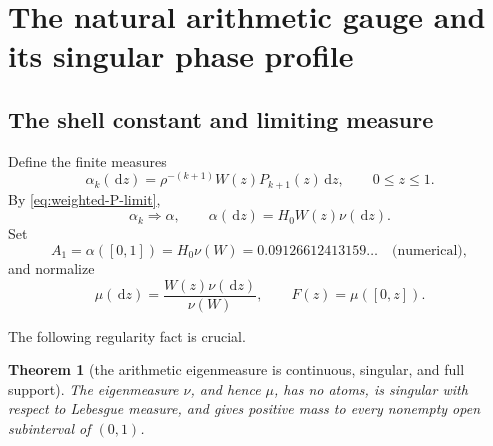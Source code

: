 \documentclass[11pt,oneside]{article}
\newtheorem{theorem}{Theorem}[section]
\theoremstyle{definition}
\theoremstyle{remark}
\newcommand{\dd}{\,\mathrm d}
\begin{document}
\section{The natural arithmetic gauge and its singular phase profile}
\label{sec:natural-gauge}

\subsection{The shell constant and limiting measure}

Define the finite measures
\begin{equation}
 \alpha_k(\dd z)
 =\rho^{-(k+1)}W(z)P_{k+1}(z)\dd z,
 \qquad 0\le z\le1.
 \label{eq:alpha-k}
\end{equation}
By \eqref{eq:weighted-P-limit},
\begin{equation}
 \alpha_k\Longrightarrow\alpha,
 \qquad
 \alpha(\dd z)=H_0W(z)\nu(\dd z).
 \label{eq:alpha-limit}
\end{equation}
Set
\begin{equation}
 A_1=\alpha([0,1])=H_0\nu(W)
 =0.09126612413159\ldots\quad\text{(numerical)},
 \label{eq:A1}
\end{equation}
and normalize
\begin{equation}
 \mu(\dd z)=\frac{W(z)\nu(\dd z)}{\nu(W)},
 \qquad
 F(z)=\mu([0,z]).
 \label{eq:mu-F}
\end{equation}

The following regularity fact is crucial.

\begin{theorem}[the arithmetic eigenmeasure is continuous, singular, and full support]
\label{thm:nu-singular}
The eigenmeasure \(\nu\), and hence \(\mu\), has no atoms, is singular with
respect to Lebesgue measure, and gives positive mass to every nonempty open
subinterval of \((0,1)\).
\end{theorem}
\end{document}
